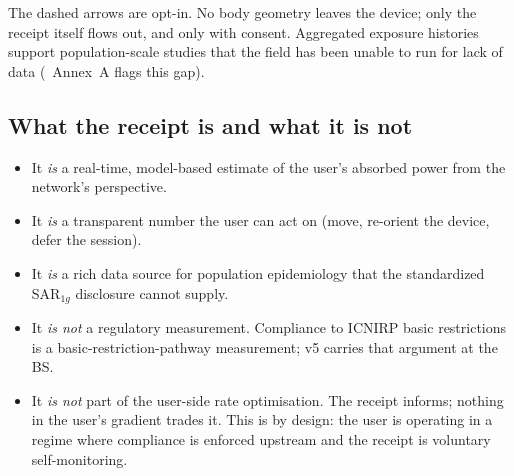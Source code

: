 \documentclass[11pt,a4paper]{article}
\theoremstyle{definition}
\newcommand{\Qabs}{\mathbf{Q}_{\mathrm{ab}}}
\newcommand{\thetab}{\bm{\theta}}
\begin{document}
\begin{center}
\end{center}

The dashed arrows are opt-in.  No body geometry leaves the device;
only the receipt itself flows out, and only with consent.  Aggregated
exposure histories support population-scale studies that the field
has been unable to run for lack of data
(\cite{ICNIRP2020}~Annex~A flags this gap).

\subsection{What the receipt is and what it is not}

\begin{itemize}[leftmargin=1.6em,itemsep=3pt]
\item It \emph{is} a real-time, model-based estimate of the user's
absorbed power from the network's perspective.
\item It \emph{is} a transparent number the user can act on (move,
re-orient the device, defer the session).
\item It \emph{is} a rich data source for population epidemiology
that the standardized SAR$_{1g}$ disclosure cannot supply.
\item It \emph{is not} a regulatory measurement.  Compliance to
ICNIRP basic restrictions is a basic-restriction-pathway
measurement; v5 carries that argument at the BS.
\item It \emph{is not} part of the user-side rate optimisation.
The receipt informs; nothing in the user's gradient trades it.
This is by design: the user is operating in a regime where
compliance is enforced upstream and the receipt is voluntary
self-monitoring.
\end{itemize}
\end{document}
